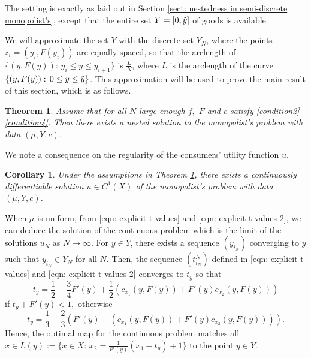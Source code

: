 \documentclass[12pt,reqno]{amsart}
\newtheorem{theorem}{Theorem}
\newtheorem{corollary}{Corollary}
\begin{document}
The setting is  exactly as laid out in Section \ref{sect: nestedness in semi-discrete monopolist's}, except that the entire set $Y=[0,\Tilde{y}]$ of goods is available.

We will approximate the set $Y$ with the discrete set $Y_N$, where the points $z_i = (y_i,F(y_i))$ are equally spaced, so that the arclength of $\{(y,F(y)):\, y_i\le y\le y_{i+1}\}$ is $\frac{L}{N}$, where $L$ is the arclength of the curve $\{(y,F(y)):\, 0\le y\le\Tilde{y}\}$.
This approximation will be used to prove the main result of this section, which is as follows.
\begin{theorem}\label{cont.nestedness}
    Assume that for all $N$ large enough $f,$ $F$ and $c$ satisfy  \ref{condition2}--\ref{condition4}. Then there exists a nested solution to the monopolist's problem with data $(\mu, Y,c)$.
 \end{theorem}  
We note a consequence on the regularity of the consumers' utility function $u.$
\begin{corollary}\label{c1}
    Under the assumptions in Theorem \ref{cont.nestedness}, there exists a continuously differentiable solution $u\in C^1(X)$ of the monopolist's problem with data $(\mu, Y,c)$.
\end{corollary}




When $\mu$ is uniform, from \eqref{eqn: explicit t values} and \eqref{eqn: explicit t values 2}, we can deduce the solution of the continuous problem which is the limit of the solutions $u_N$ as $N\to\infty.$ For $y\in Y$, there exists a sequence $(y_{i_N})$ converging to $y$ such that $y_{i_N}\in Y_N$ for all $N.$ Then, the sequence $(t_{i_N}^N)$ defined in \eqref{eqn: explicit t values} and \eqref{eqn: explicit t values 2} converges to $t_y$ so that 
\[t_y=\frac{1}{2}-\frac{3}{4}F'(y)+\frac{1}{2}(c_{x_1}(y,F(y))+F'(y)c_{x_2}(y,F(y)))\]
if $t_y+F'(y)<1,$ otherwise
\[t_y=\frac{1}{3}-\frac{2}{3}(F'(y)-(c_{x_1}(y,F(y))+F'(y)c_{x_2}(y,F(y)))).\]
Hence, the optimal map for the continuous problem matches all $x\in L(y):=\{x\in X:\, x_2=\frac{1}{F'(y)}(x_1-t_y)+1\}$ to the point $y\in Y.$
\end{document}
